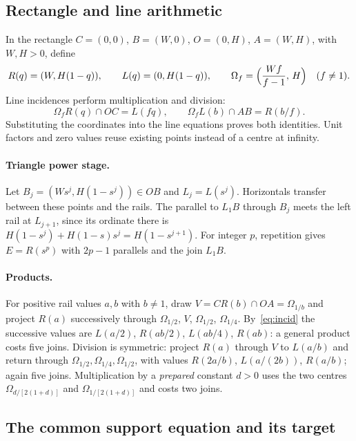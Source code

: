 \documentclass[10pt,a4paper]{article}
\theoremstyle{plain}
\theoremstyle{remark}
\numberwithin{equation}{section}
\newcommand{\Om}{\Omega}              %
\begin{document}
\subsection{Rectangle and line arithmetic}\label{sec:rect}

In the rectangle $C=(0,0)$, $B=(W,0)$, $O=(0,H)$, $A=(W,H)$, with $W,H>0$, define
\begin{equation}\label{eq:rails}
R(q)=(W,H(1-q)),\qquad L(q)=(0,H(1-q)),\qquad \Om_f=\Bigl(\frac{Wf}{f-1},\,H\Bigr)\quad(f\neq 1).
\end{equation}
Line incidences perform multiplication and division:
\begin{equation}\label{eq:incid}
\Om_fR(q)\cap OC=L(fq),\qquad \Om_fL(b)\cap AB=R(b/f).
\end{equation}
Substituting the coordinates into the line equations proves both identities. Unit factors and zero
values reuse existing points instead of a centre at infinity.

\paragraph{Triangle power stage.}
Let $B_j=(Ws^{j},H(1-s^{j}))\in OB$ and $L_j=L(s^{j})$. Horizontals transfer between these points and
the rails. The parallel to $L_1B$ through $B_j$ meets the left rail at $L_{j+1}$, since its ordinate
there is $H(1-s^{j})+H(1-s)s^{j}=H(1-s^{j+1})$. For integer $p$, repetition gives $E=R(s^{p})$ with
$2p-1$ parallels and the join $L_1B$.

\paragraph{Products.}
For positive rail values $a,b$ with $b\neq 1$, draw $V=CR(b)\cap OA=\Om_{1/b}$ and project $R(a)$
successively through $\Om_{1/2}$, $V$, $\Om_{1/2}$, $\Om_{1/4}$. By~\eqref{eq:incid} the successive
values are $L(a/2)$, $R(ab/2)$, $L(ab/4)$, $R(ab)$: a general product costs five joins. Division is
symmetric: project $R(a)$ through $V$ to $L(a/b)$ and return through $\Om_{1/2},\Om_{1/4},\Om_{1/2}$,
with values $R(2a/b)$, $L(a/(2b))$, $R(a/b)$; again five joins. Multiplication by a \emph{prepared}
constant $d>0$ uses the two centres $\Om_{d/[2(1+d)]}$ and $\Om_{1/[2(1+d)]}$ and costs two joins.

\subsection{The common support equation and its target}
\end{document}
